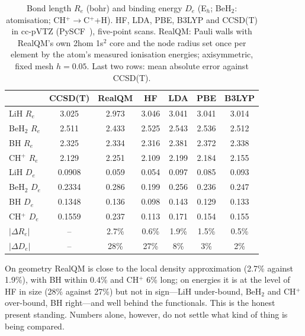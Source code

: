 \documentclass[11pt]{article}
\begin{document}
\begin{table}[h]
\centering\small
\caption{Bond length $R_e$ (bohr) and binding energy $D_e$ (E$_h$; BeH$_2$: atomisation; CH$^+\to$C$^+$+H).
HF, LDA, PBE, B3LYP and CCSD(T) in cc-pVTZ (PySCF~\cite{pyscf}), five-point scans. RealQM: Pauli walls with
RealQM's own 2hom 1s$^2$ core and the node radius set once per element by the atom's measured ionisation
energies; axisymmetric, fixed mesh $h=0.05$. Last two rows: mean absolute error against CCSD(T).}
\label{tab:dft}
\begin{tabular}{lcccccc}
\hline
 & CCSD(T) & RealQM & HF & LDA & PBE & B3LYP\\
\hline
LiH $R_e$ & 3.025 & 2.973 & 3.046 & 3.041 & 3.041 & 3.014\\
BeH$_2$ $R_e$ & 2.511 & 2.433 & 2.525 & 2.543 & 2.536 & 2.512\\
BH $R_e$ & 2.325 & 2.334 & 2.316 & 2.381 & 2.372 & 2.338\\
CH$^+$ $R_e$ & 2.129 & 2.251 & 2.109 & 2.199 & 2.184 & 2.155\\
LiH $D_e$ & 0.0908 & 0.059 & 0.054 & 0.097 & 0.085 & 0.093\\
BeH$_2$ $D_e$ & 0.2334 & 0.286 & 0.199 & 0.256 & 0.236 & 0.247\\
BH $D_e$ & 0.1348 & 0.136 & 0.098 & 0.143 & 0.129 & 0.133\\
CH$^+$ $D_e$ & 0.1559 & 0.237 & 0.113 & 0.171 & 0.154 & 0.155\\
\hline
$|\Delta R_e|$ & -- & 2.7\% & 0.6\% & 1.9\% & 1.5\% & 0.5\%\\
$|\Delta D_e|$ & -- & 28\% & 27\% & 8\% & 3\% & 2\%\\
\hline
\end{tabular}
\end{table}

On geometry RealQM is close to the local density approximation (2.7\% against 1.9\%), with BH within
0.4\% and CH$^+$ 6\% long; on energies it is at the level of HF in size (28\% against 27\%) but not in
sign---LiH under-bound, BeH$_2$ and CH$^+$ over-bound, BH right---and well behind the functionals. This is the honest present standing.
Numbers alone, however, do not settle what kind of thing is being compared.
\end{document}
